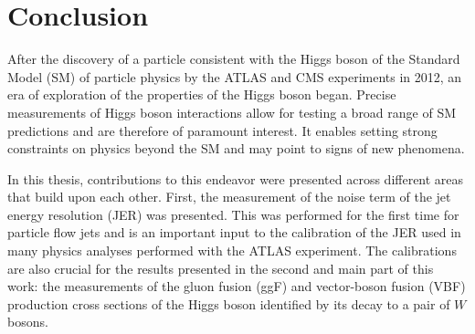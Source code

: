 \chapter{Conclusion}
\label{chap:conclusion}

After the discovery of a particle consistent with the Higgs boson of the Standard Model (SM) of particle physics by the ATLAS and CMS experiments in 2012, an era of exploration of the properties of the Higgs boson began.
Precise measurements of Higgs boson interactions allow for testing a broad range of SM predictions and are therefore of paramount interest.
It enables setting strong constraints on physics beyond the SM and may point to signs of new phenomena. %

In this thesis, contributions to this endeavor were presented across different areas that build upon each other. 
First, the measurement of the noise term of the jet energy resolution (JER) was presented. 
This was performed for the first time for particle flow jets and is an important input to the calibration of the JER used in many physics analyses performed with the ATLAS experiment. 
The calibrations are also crucial for the results presented in the second and main part of this work: the measurements of the gluon fusion (ggF) and vector-boson fusion (VBF) production cross sections of the Higgs boson identified by its decay to a pair of $W$ bosons.

